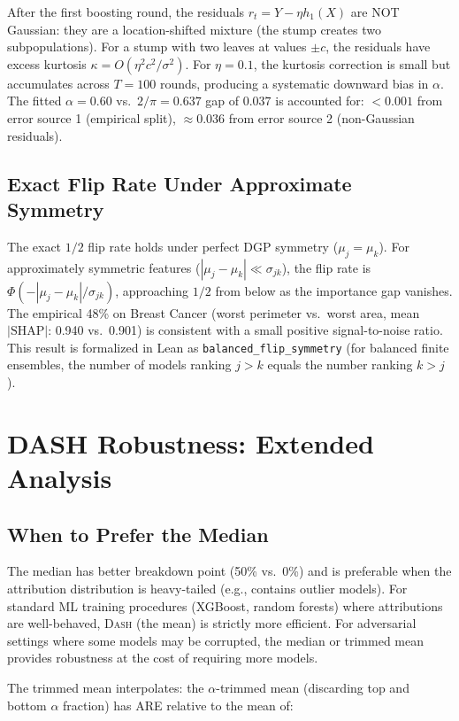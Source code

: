 \documentclass{article}
\newcommand{\SHAP}{\mathrm{SHAP}}
\newcommand{\DASH}{\textsc{Dash}}
\begin{document}
After the first boosting round, the residuals $r_t = Y - \eta h_1(X)$ are NOT Gaussian: they are a location-shifted mixture (the stump creates two subpopulations). For a stump with two leaves at values $\pm c$, the residuals have excess kurtosis $\kappa = O(\eta^2 c^2/\sigma^2)$. For $\eta = 0.1$, the kurtosis correction is small but accumulates across $T = 100$ rounds, producing a systematic downward bias in $\alpha$. The fitted $\alpha = 0.60$ vs.\ $2/\pi = 0.637$ gap of $0.037$ is accounted for: $< 0.001$ from error source 1 (empirical split), $\approx 0.036$ from error source 2 (non-Gaussian residuals).

\subsection{Exact Flip Rate Under Approximate Symmetry}

The exact $1/2$ flip rate holds under perfect DGP symmetry ($\mu_j = \mu_k$). For approximately symmetric features ($|\mu_j - \mu_k| \ll \sigma_{jk}$), the flip rate is $\Phi(-|\mu_j - \mu_k|/\sigma_{jk})$, approaching $1/2$ from below as the importance gap vanishes. The empirical 48\% on Breast Cancer (worst perimeter vs.\ worst area, mean $|\SHAP|$: 0.940 vs.\ 0.901) is consistent with a small positive signal-to-noise ratio. This result is formalized in Lean as \texttt{balanced\_flip\_symmetry} (for balanced finite ensembles, the number of models ranking $j > k$ equals the number ranking $k > j$).

\section{DASH Robustness: Extended Analysis}

\subsection{When to Prefer the Median}

The median has better breakdown point (50\% vs.\ 0\%) and is preferable when the attribution distribution is heavy-tailed (e.g., contains outlier models). For standard ML training procedures (XGBoost, random forests) where attributions are well-behaved, \DASH{} (the mean) is strictly more efficient. For adversarial settings where some models may be corrupted, the median or trimmed mean provides robustness at the cost of requiring more models.

The trimmed mean interpolates: the $\alpha$-trimmed mean (discarding top and bottom $\alpha$ fraction) has ARE relative to the mean of:
\end{document}
